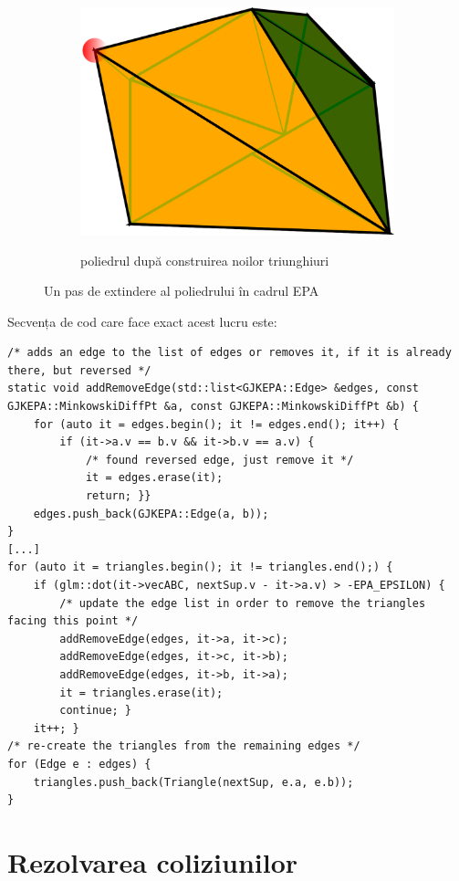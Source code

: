 \documentclass[12pt,a4paper]{report}
\begin{document}
\begin{figure}[H]
\begin{subfigure}[h]{0.32\textwidth}
 		\includegraphics[width=\textwidth]{pics/EPA2.png}
 		\label{fig:EPA2}
 		\caption{poliedrul după construirea noilor triunghiuri}
 		\vfill
	\end{subfigure}
	\caption{Un pas de extindere al poliedrului în cadrul EPA}
\end{figure}

Secvența de cod care face exact acest lucru este:
\begin{lstlisting}[style=myC++, label={code:epa_expansion_step}, caption = {extinderea politopului în cadrul EPA}]
/* adds an edge to the list of edges or removes it, if it is already there, but reversed */
static void addRemoveEdge(std::list<GJKEPA::Edge> &edges, const GJKEPA::MinkowskiDiffPt &a, const GJKEPA::MinkowskiDiffPt &b) {
	for (auto it = edges.begin(); it != edges.end(); it++) {
		if (it->a.v == b.v && it->b.v == a.v) {
			/* found reversed edge, just remove it */
			it = edges.erase(it);
			return;	}}
	edges.push_back(GJKEPA::Edge(a, b));
}
[...]
for (auto it = triangles.begin(); it != triangles.end();) {
	if (glm::dot(it->vecABC, nextSup.v - it->a.v) > -EPA_EPSILON) {
		/* update the edge list in order to remove the triangles facing this point */
		addRemoveEdge(edges, it->a, it->c);
		addRemoveEdge(edges, it->c, it->b);
		addRemoveEdge(edges, it->b, it->a);
		it = triangles.erase(it);
		continue; }
	it++; }
/* re-create the triangles from the remaining edges */
for (Edge e : edges) {
	triangles.push_back(Triangle(nextSup, e.a, e.b));
}
\end{lstlisting}

\section{Rezolvarea coliziunilor}
\end{document}
